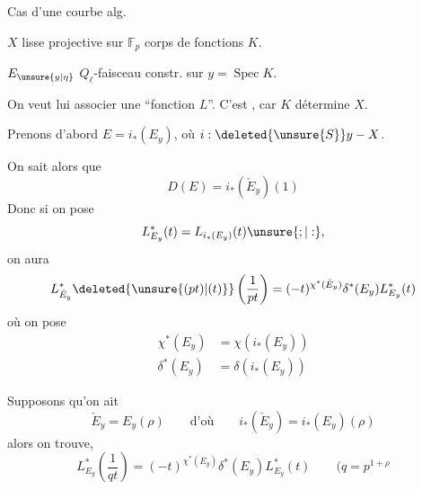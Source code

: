 Cas d'une courbe alg.

$X$  lisse projective  sur $\mathbb F_p$\unsure{,}  corps de fonctions $K$.

$E_{\unsure{y|\eta}}$ $Q_\ell$-faisceau constr. sur $y=\operatorname{Spec}K$.

On veut lui associer une \textquotedblleft fonction $L$\textquotedblright. C'est , car $K$ détermine $X$.

Prenons d'abord $E=i_*(E_y)$, où $i:\deleted{\unsure{S}}y\mathbin{-}X$.

On sait alors que
\[
 D(E)=i_*(\check E_y)(1)
\]
 Donc si on pose
\[
 L^*_{E_y}(t)=L_{i_*(E_y)}(t)\unsure{;|:},
\]
on aura
\[
 L^*_{\check E_y}\deleted{\unsure{(pt)|(t)}}\left(\frac{1}{pt}\right)
 =(-t)^{\chi^*(\check E_y)}\delta^*(E_y)L^*_{E_y}(t)
\]
où on pose
\[
 \begin{aligned}
 \chi^*(E_y)&=\chi\left(i_*(E_y)\right)\\
 \delta^*(E_y)&=\delta\left(i_*(E_y)\right)
 \end{aligned}
\]

Supposons qu'on ait
\[
 \check E_y=E_y(\rho)\qquad\text{d'où}\qquad
 i_*(\check E_y)=i_*(E_y)(\rho)
\]
alors on trouve,
\[
 \boxed{L^*_{E_y}\left(\frac{1}{qt}\right)
 =(-t)^{\chi^*(E_y)}\delta^*(E_y)L^*_{E_y}(t)}
 \qquad (q=p^{1+\rho}
\]

